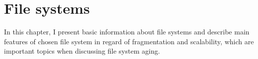 \documentclass[
  color, %
  table, %
  lof,   %
  lot,   %
]{fithesis3}
\begin{document}








\chapter{File systems}
In this chapter, I present basic information about file systems and describe main features of chosen file system in regard of fragmentation and scalability, which are important topics when discussing file system aging.
\end{document}

